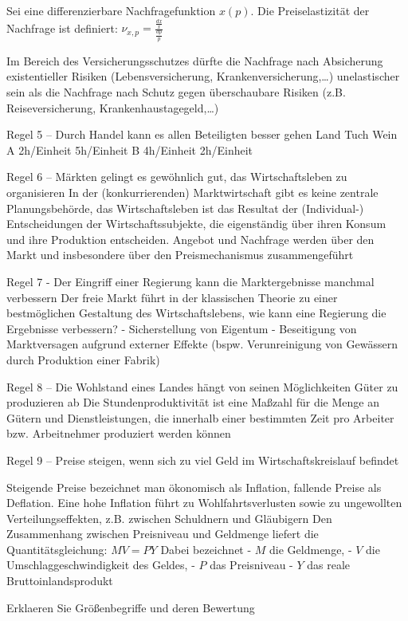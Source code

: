 Sei eine differenzierbare Nachfragefunktion \( x(p) \). Die Preiselastizität der Nachfrage ist definiert:
\( \nu_{x,p} = \frac{\frac{dx}{x}}{\frac{dp}{p}} \)

Im Bereich des Versicherungsschutzes dürfte die Nachfrage nach Absicherung existentieller Risiken 
(Lebensversicherung, Krankenversicherung,…) unelastischer sein als die Nachfrage nach Schutz gegen überschaubare Risiken 
(z.B. Reiseversicherung, Krankenhaustagegeld,…)

Regel 5 – Durch Handel kann es allen Beteiligten besser gehen
Land Tuch Wein
A
2h/Einheit 5h/Einheit
B
4h/Einheit 2h/Einheit


Regel 6 – Märkten gelingt es gewöhnlich gut, das Wirtschaftsleben zu organisieren
In der (konkurrierenden) Marktwirtschaft gibt es keine zentrale Planungsbehörde, 
das Wirtschaftsleben ist das Resultat der (Individual-) Entscheidungen
der Wirtschaftssubjekte, die eigenständig über ihren Konsum und ihre Produktion entscheiden.
Angebot und Nachfrage werden über den Markt und insbesondere über den Preismechanismus zusammengeführt

Regel 7 - Der Eingriff einer Regierung kann die Marktergebnisse manchmal verbessern
Der freie Markt führt in der klassischen Theorie zu einer bestmöglichen Gestaltung des Wirtschaftslebens, 
wie kann eine Regierung die Ergebnisse verbessern?
- Sicherstellung von Eigentum
- Beseitigung von Marktversagen aufgrund externer Effekte (bspw. Verunreinigung von Gewässern durch Produktion einer Fabrik)

Regel 8 – Die Wohlstand eines Landes hängt von seinen Möglichkeiten Güter zu produzieren ab
Die Stundenproduktivität ist eine Maßzahl für die Menge an Gütern und Dienstleistungen, 
die innerhalb einer bestimmten Zeit pro Arbeiter bzw. Arbeitnehmer produziert werden können

Regel 9 – Preise steigen, wenn sich zu viel Geld im Wirtschaftskreislauf befindet

Steigende Preise bezeichnet man ökonomisch als Inflation, fallende Preise als Deflation. 
Eine hohe Inflation führt zu Wohlfahrtsverlusten sowie zu ungewollten
Verteilungseffekten, z.B. zwischen Schuldnern und Gläubigern
Den Zusammenhang zwischen Preisniveau und Geldmenge liefert die Quantitätsgleichung:
\( MV = PY \)
Dabei bezeichnet 
- \( M \) die Geldmenge, 
- \( V \) die Umschlaggeschwindigkeit des Geldes, 
- \( P \) das Preisniveau 
- \( Y \) das reale Bruttoinlandsprodukt


Erklaeren Sie Größenbegriffe und deren Bewertung

